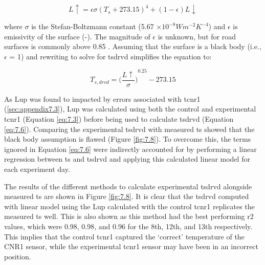 \documentclass[final,3p,times,authoryear]{elsarticle}
\begin{document}
\begin{equation}
L\uparrow = \epsilon \sigma (T_{s} + 273.15)^{4} + (1 - \epsilon) L\downarrow
\label{eq:7.5}
\end{equation}

where $\sigma$ is the Stefan-Boltzmann constant (5.67 $\times 10^{-8} Wm^{-2}K^{-4}$) and $\epsilon$ is emissivity of the surface (-). The magnitude of $\epsilon$ is unknown, but for road surfaces is commonly above 0.85 \citep{Oke2017}. Assuming that the surface is a black body (i.e., $\epsilon$ = 1) and rewriting to solve for \gls{tsdrvd} simplifies the equation to:

\begin{equation}
T_{s,drvd} =  { \bigg( \frac{  L\uparrow } {\sigma}   \bigg) }^{0.25} - 273.15
\label{eq:7.6}
\end{equation}

As \gls{Lup} was found to impacted by errors associated with \gls{tcnr1} (\ref{sec:appendix7.3}), \gls{Lup} was calculated using both the control and experimental \gls{tcnr1} (Equation \ref{eq:7.3}) before being used to calculate \gls{tsdrvd} (Equation \ref{eq:7.6}). Comparing the experimental \gls{tsdrvd} with measured \gls{ts} showed that the black body assumption is flawed (Figure \ref{fig:7.8}). To overcome this, the terms ignored in Equation \ref{eq:7.6} were indirectly accounted for by performing a linear regression between \gls{ts} and \gls{tsdrvd} and applying this calculated linear model for each experiment day.

The results of the different methods to calculate experimental \gls{tsdrvd} alongside measured \gls{ts} are shown in Figure \ref{fig:7.8}. It is clear that the \gls{tsdrvd} computed with linear model using the \gls{Lup} calculated with the control \gls{tcnr1} replicates the measured \gls{ts} well. This is also shown as this method had the best performing \gls{r2} values, which were 0.98, 0.98, and 0.96 for the 8th, 12th, and 13th respectively. This implies that the control \gls{tcnr1} captured the `correct' temperature of the CNR1 sensor, while the experimental \gls{tcnr1} sensor may have been in an incorrect position.
\end{document}
